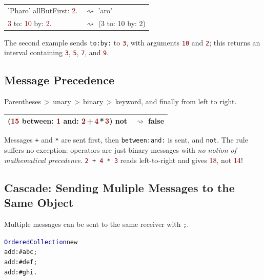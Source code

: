 \documentclass[notumble]{leaflet}
\makeatletter
\newenvironment{displaycode}{%
     \par
     \hspace{1.5em}\begin{minipage}{\linewidth}
       \begin{alltt}\small}{
       \end{alltt}
     \end{minipage}
     \par}
\newcommand{\code}[1]{\foreignlanguage{english}{\texttt{#1}}}
\makeatother
\begin{document}
\noindent
\begin{tabularx}{\linewidth}{@{}lX@{}}
        \toprule
     \textcolor{string}{'Pharo'} allButFirst: \textcolor{darkRed}{2}.& $\rightsquigarrow$ 'aro' \\
     \textcolor{darkRed}{3} to: \textcolor{darkRed}{10} by: \textcolor{darkRed}{2}.& $\rightsquigarrow$ (3 to: 10 by: 2)\\
       \midrule
\end{tabularx}

The second example sends
\code{to:by:} to \textcolor{darkRed}{\code{3}}, with arguments
\textcolor{darkRed}{\code{10}} and \textcolor{darkRed}{\code{2}}; this
returns an interval containing \textcolor{darkRed}{\code{3}},
\textcolor{darkRed}{\code{5}}, \textcolor{darkRed}{\code{7}}, and
\textcolor{darkRed}{\code{9}}.

\subsection{Message Precedence}

Parentheses\,$>$\,unary\,$>$\,binary\,$>$\,keyword, and finally from
left to right.

\noindent
\begin{tabularx}{\linewidth}{@{}lX@{}}
        \toprule
    (\textcolor{darkRed}{15} between: \textcolor{darkRed}{1} and: \textcolor{darkRed}{2}\,+\,\textcolor{darkRed}{4}\,*\,\textcolor{darkRed}{3}) not& $\rightsquigarrow$ false \\
       \midrule
\end{tabularx}



Messages \code{+} and \code{*} are sent first, then \code{between:and:} is sent, and \code{not}.
The rule suffers no exception: operators are just binary messages with \emph{no notion of mathematical precedence}.
\code{\textcolor{darkRed}{2}\,+\,\textcolor{darkRed}{4}\,*\,\textcolor{darkRed}{3}} reads left-to-right and gives \textcolor{darkRed}{18}, not \textcolor{darkRed}{14}!


\subsection{Cascade: Sending Muliple Messages to the Same Object}

Multiple messages can be sent to the same receiver with \code{;}.

\begin{displaycode}
\textcolor{darkBlue}{OrderedCollection} new
  add: \textcolor{string}{#abc};
  add: \textcolor{string}{#def};
  add: \textcolor{string}{#ghi}.
\end{displaycode}
\end{document}
